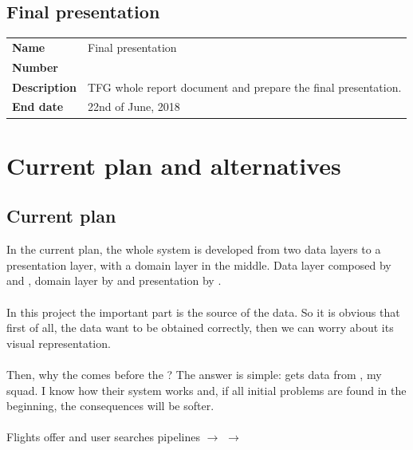 
\subsection{Final presentation}

\begin{table}[H]
\begin{tabular}{>{\raggedleft\arraybackslash}p{3cm}>{\raggedright\arraybackslash}p{11cm}}
\textbf{Name}        & Final presentation \\
\textbf{Number}      & 31 \\
\textbf{Description} & TFG whole report document and prepare the final presentation. \\
\textbf{End date}    & 22nd of June, 2018 \\
\end{tabular}
\label{milestone7}
\end{table}


\section{Current plan and alternatives}

\subsection{Current plan}

In the current plan, the whole system is developed from two data layers to a presentation layer, with a domain layer in the middle. Data layer composed by  and , domain layer by  and presentation by .
\\\\
In this project the important part is the source of the data. So it is obvious that first of all, the data want to be obtained correctly, then we can worry about its visual representation.
\\\\
Then, why the  comes before the ? The answer is simple:  gets data from \squad, my squad. I know how their system works and, if all initial problems are found in the beginning, the consequences will be softer.
\\\\
Flights offer and user searches pipelines $\longrightarrow$  $\longrightarrow$ 

